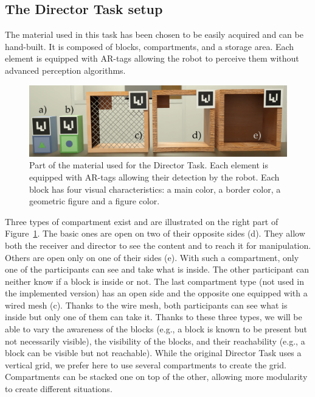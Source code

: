 \subsection{The Director Task setup}

The material used in this task has been chosen to be easily acquired and can be hand-built. It is composed of blocks, compartments, and a storage area. Each element is equipped with AR-tags allowing the robot to perceive them without advanced perception algorithms.

\begin{figure}[ht!]
\centering
\includegraphics[width=\textwidth]{figures/chapter9/material.png}
\caption{\label{fig:chap9_material} Part of the material used for the Director Task. Each element is equipped with AR-tags allowing their detection by the robot. Each block has four visual characteristics: a main color, a border color, a geometric figure  and a figure color. }
\end{figure}

Three types of compartment exist and are illustrated on the right part of Figure~\ref{fig:chap9_material}. The basic ones are open on two of their opposite sides (d). They allow both the receiver and director to see the content and to reach it for manipulation. Others are open only on one of their sides (e). With such a compartment, only one of the participants can see and take what is inside. The other participant can neither know if a block is inside or not. The last compartment type (not used in the implemented version) has an open side and the opposite one equipped with a wired mesh (c). Thanks to the wire mesh, both participants can see what is inside but only one of them can take it. Thanks to these three types, we will be able to vary the awareness of the blocks (e.g., a block is known to be present but not necessarily visible), the visibility of the blocks, and their reachability (e.g., a block can be visible but not reachable). While the original Director Task uses a vertical grid, we prefer here to use several compartments to create the grid. Compartments can be stacked one on top of the other, allowing more modularity to create different situations.

